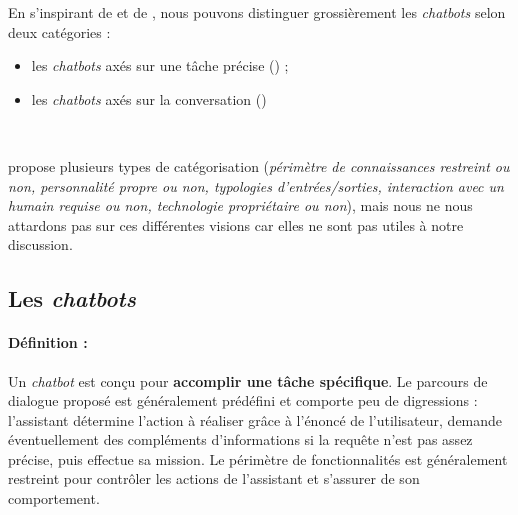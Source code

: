 	En s'inspirant de \cite{chen-etal:2017:survey-dialogue-systems} et de \cite{adamopoulou-moussiades:2020:overview-chatbot-technology}, nous pouvons distinguer grossièrement les \textit{chatbots} selon deux catégories :
	\begin{itemize}
		\item les \textit{chatbots} axés sur une tâche précise () ;
		\item les \textit{chatbots} axés sur la conversation ()
	\end{itemize}
		\cite{adamopoulou-moussiades:2020:overview-chatbot-technology}  \\ %
	
	\begin{leftBarInformation}
		\cite{adamopoulou-moussiades:2020:overview-chatbot-technology} propose plusieurs types de catégorisation (\textit{périmètre de connaissances restreint ou non, personnalité propre ou non, typologies d'entrées/sorties, interaction avec un humain requise ou non, technologie propriétaire ou non}), mais nous ne nous attardons pas sur ces différentes visions car elles ne sont pas utiles à notre discussion.
	\end{leftBarInformation}
	
	
	\subsection{Les \textit{chatbots} }
	\label{annex:B.1.1-CHATBOT-CLASSIFICATION-TASK-ORIENTED}
	
		\paragraph{Définition :}
		
			Un \textit{chatbot}  est conçu pour \textbf{accomplir une tâche spécifique}.
			Le parcours de dialogue proposé est généralement prédéfini et comporte peu de digressions : l'assistant détermine l'action à réaliser grâce à l'énoncé de l'utilisateur, demande éventuellement des compléments d'informations si la requête n'est pas assez précise, puis effectue sa mission.
			Le périmètre de fonctionnalités est généralement restreint pour contrôler les actions de l'assistant et s'assurer de son comportement.
	
